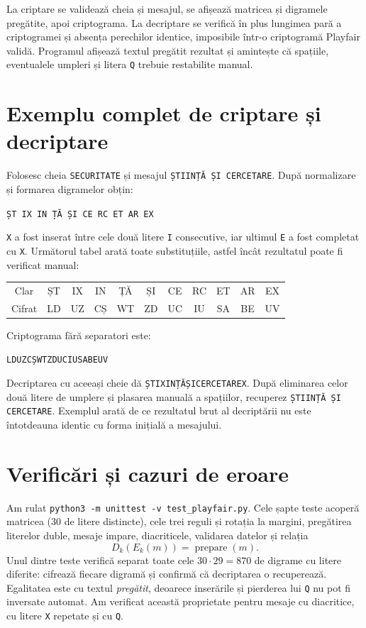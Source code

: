 \documentclass[12pt,a4paper]{article}
\newcommand{\file}[1]{\texttt{#1}}
\begin{document}
La criptare se validează cheia și mesajul, se afișează matricea și digramele
pregătite, apoi criptograma. La decriptare se verifică în plus lungimea pară a
criptogramei și absența perechilor identice, imposibile într-o criptogramă
Playfair validă. Programul afișează textul pregătit rezultat și amintește că
spațiile, eventualele umpleri și litera \texttt{Q} trebuie restabilite manual.

\section{Exemplu complet de criptare și decriptare}

Folosesc cheia \texttt{SECURITATE} și mesajul \texttt{ȘTIINȚĂ ȘI CERCETARE}.
După normalizare și formarea digramelor obțin:
\begin{center}
\texttt{ȘT IX IN ȚĂ ȘI CE RC ET AR EX}
\end{center}
\texttt{X} a fost inserat între cele două litere \texttt{I} consecutive,
iar ultimul \texttt{E} a fost completat cu \texttt{X}. Următorul tabel arată
toate substituțiile, astfel încât rezultatul poate fi verificat manual:

\begin{center}
\begin{tabular}{ccccccccccc}
\toprule
Clar&ȘT&IX&IN&ȚĂ&ȘI&CE&RC&ET&AR&EX\\
Cifrat&LD&UZ&CȘ&WT&ZD&UC&IU&SA&BE&UV\\
\bottomrule
\end{tabular}
\end{center}

Criptograma fără separatori este:
\begin{center}
\large\texttt{LDUZCȘWTZDUCIUSABEUV}
\end{center}
Decriptarea cu aceeași cheie dă \texttt{ȘTIXINȚĂȘICERCETAREX}. După eliminarea
celor două litere de umplere și plasarea manuală a spațiilor, recuperez
\texttt{ȘTIINȚĂ ȘI CERCETARE}. Exemplul arată de ce rezultatul brut al
decriptării nu este întotdeauna identic cu forma inițială a mesajului.

\section{Verificări și cazuri de eroare}

Am rulat \file{python3 -m unittest -v test\_playfair.py}. Cele șapte teste acoperă
matricea (30 de litere distincte), cele trei reguli și rotația la margini,
pregătirea literelor duble, mesaje impare, diacriticele, validarea datelor și
relația
\[
 D_k(E_k(m))=\operatorname{prepare}(m).
\]
Unul dintre teste verifică separat toate cele $30\cdot29=870$ de digrame cu
litere diferite: cifrează fiecare digramă și confirmă că decriptarea o recuperează.
Egalitatea este cu textul \emph{pregătit}, deoarece inserările și pierderea lui
\texttt{Q} nu pot fi inversate automat. Am verificat această proprietate pentru
mesaje cu diacritice, cu litere \texttt{X} repetate și cu \texttt{Q}.
\end{document}
